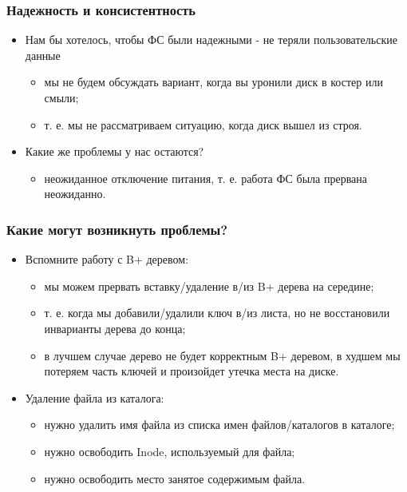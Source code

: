 \begin{frame}
\frametitle{Надежность и консистентность}
\begin{itemize}
  \item Нам бы хотелось, чтобы ФС были надежными - не теряли
  пользовательские данные
  \begin{itemize}
    \item мы не будем обсуждать вариант, когда вы уронили диск в костер или
    смыли;
    \item т. е. мы не рассматриваем ситуацию, когда диск вышел из строя.
  \end{itemize}
  \item Какие же проблемы у нас остаются?
  \begin{itemize}
    \item неожиданное отключение питания, т. е. работа ФС была прервана
    неожиданно.
  \end{itemize}
\end{itemize}
\end{frame}

\begin{frame}
\frametitle{Какие могут возникнуть проблемы?}
\begin{itemize}
  \item Вспомните работу с B+ деревом:
  \begin{itemize}
    \item мы можем прервать вставку/удаление в/из B+ дерева на середине;
    \item т. е. когда мы добавили/удалили ключ в/из листа, но не восстановили
    инварианты дерева до конца;
    \item в лучшем случае дерево не будет корректным B+ деревом, в худшем мы
    потеряем часть ключей и произойдет утечка места на диске.
  \end{itemize}
  \item Удаление файла из каталога:
  \begin{itemize}
    \item нужно удалить имя файла из списка имен файлов/каталогов в каталоге;
    \item нужно освободить Inode, используемый для файла;
    \item нужно освободить место занятое содержимым файла.
  \end{itemize}
\end{itemize}
\end{frame}


